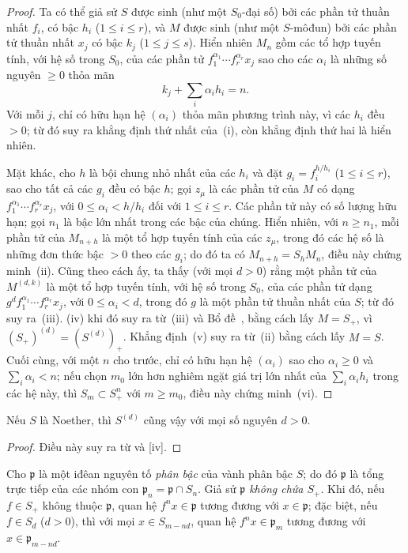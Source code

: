 \documentclass[oneside,10pt]{amsart}
\renewcommand{\leq}{\leqslant}
\renewcommand{\geq}{\geqslant}
\newcommand{\oldpage}[2][]{\marginnote{\normalfont\footnotesize\textbf{#1}~|~#2}\ignorespaces}
\let\EGAOriginalLabel\label
\renewcommand{\label}[1]{\phantomsection\EGAOriginalLabel{#1}}
\begin{document}
\begin{proof}
Ta có thể giả sử $S$ được sinh (như một $S_0$-đại số) bởi các phần tử thuần nhất $f_i$, có bậc $h_i$ ($1\leq i\leq r$), và $M$ được sinh (như một $S$-môđun) bởi các phần tử thuần nhất $x_j$ có bậc $k_j$ ($1\leq j\leq s$).
Hiển nhiên $M_n$ gồm các tổ hợp
\oldpage[II]{22}
tuyến tính, với hệ số trong $S_0$, của các phần tử $f_1^{\alpha_1}\cdots f_r^{\alpha_r}x_j$ sao cho các $\alpha_i$ là những số nguyên $\geq0$ thỏa mãn
\[
  k_j+\sum_i\alpha_i h_i=n.
\]
Với mỗi $j$, chỉ có hữu hạn hệ $(\alpha_i)$ thỏa mãn phương trình này, vì các $h_i$ đều $>0$; từ đó suy ra khẳng định thứ nhất của~(i), còn khẳng định thứ hai là hiển nhiên.

Mặt khác, cho $h$ là bội chung nhỏ nhất của các $h_i$ và đặt $g_i=f_i^{h/h_i}$ ($1\leq i\leq r$), sao cho tất cả các $g_i$ đều có bậc $h$; gọi $z_\mu$ là các phần tử của $M$ có dạng $f_1^{\alpha_1}\cdots f_r^{\alpha_r}x_j$, với $0\leq\alpha_i<h/h_i$ đối với $1\leq i\leq r$.
Các phần tử này có số lượng hữu hạn; gọi $n_1$ là bậc lớn nhất trong các bậc của chúng.
Hiển nhiên, với $n\geq n_1$, mỗi phần tử của $M_{n+h}$ là một tổ hợp tuyến tính của các $z_\mu$, trong đó các hệ số là những đơn thức bậc $>0$ theo các $g_i$; do đó ta có $M_{n+h}=S_hM_n$, điều này chứng minh~(ii).
Cũng theo cách ấy, ta thấy (với mọi $d>0$) rằng một phần tử của $M^{(d,k)}$ là một tổ hợp tuyến tính, với hệ số trong $S_0$, của các phần tử dạng $g^d f_1^{\alpha_1}\cdots f_r^{\alpha_r}x_j$, với $0\leq\alpha_i<d$, trong đó $g$ là một phần tử thuần nhất của $S$; từ đó suy ra~(iii).
(iv) khi đó suy ra từ~(iii) và Bổ đề~, bằng cách lấy $M=S_+$, vì $(S_+)^{(d)}=(S^{(d)})_+$.
Khẳng định~(v) suy ra từ~(ii) bằng cách lấy $M=S$.
Cuối cùng, với một $n$ cho trước, chỉ có hữu hạn hệ $(\alpha_i)$ sao cho $\alpha_i\geq0$ và $\sum_i\alpha_i<n$; nếu chọn $m_0$ lớn hơn nghiêm ngặt giá trị lớn nhất của $\sum_i\alpha_i h_i$ trong các hệ này, thì $S_m\subset S_+^n$ với $m\geq m_0$, điều này chứng minh~(vi).
\end{proof}

\begin{corollary}[2.1.7]
\label{II.2.1.7}
Nếu $S$ là Noether, thì $S^{(d)}$ cũng vậy với mọi số nguyên $d>0$.
\end{corollary}

\begin{proof}
Điều này suy ra từ  và [iv].
\end{proof}

\begin{env}[2.1.8]
\label{II.2.1.8}
Cho $\mathfrak{p}$ là một iđêan nguyên tố \emph{phân bậc} của vành phân bậc $S$; do đó $\mathfrak{p}$ là tổng trực tiếp của các nhóm con $\mathfrak{p}_n=\mathfrak{p}\cap S_n$.
Giả sử \emph{$\mathfrak{p}$ không chứa $S_+$}.
Khi đó, nếu $f\in S_+$ không thuộc $\mathfrak{p}$, quan hệ $f^nx\in\mathfrak{p}$ tương đương với $x\in\mathfrak{p}$; đặc biệt, nếu $f\in S_d$ ($d>0$), thì với mọi $x\in S_{m-nd}$, quan hệ $f^nx\in\mathfrak{p}_m$ tương đương với $x\in\mathfrak{p}_{m-nd}$.
\end{env}
\end{document}
